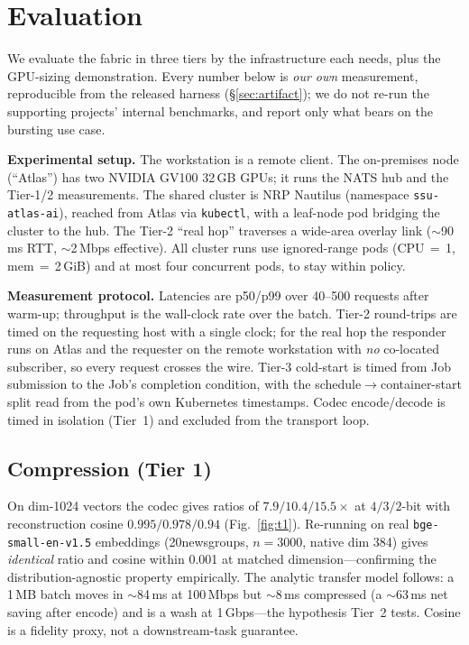 \documentclass[conference]{IEEEtran}
\begin{document}
\section{Evaluation}\label{sec:eval}
We evaluate the fabric in three tiers by the infrastructure each needs, plus the GPU-sizing
demonstration. Every number below is \emph{our own} measurement, reproducible from the released
harness (\S\ref{sec:artifact}); we do not re-run the supporting projects' internal benchmarks, and
report only what bears on the bursting use case.

\textbf{Experimental setup.} The workstation is a remote client. The on-premises node (``Atlas'')
has two NVIDIA GV100 32\,GB GPUs; it runs the NATS hub and the Tier-1/2 measurements. The shared
cluster is NRP Nautilus (namespace \texttt{ssu-atlas-ai}), reached from Atlas via \texttt{kubectl},
with a leaf-node pod bridging the cluster to the hub. The Tier-2 ``real hop'' traverses a
wide-area overlay link ($\sim$90\,ms RTT, $\sim$2\,Mbps effective). All cluster runs use
ignored-range pods (CPU\,$=$\,1, mem\,$=$\,2\,GiB) and at most four concurrent pods, to stay within
policy.

\textbf{Measurement protocol.} Latencies are p50/p99 over 40--500 requests after warm-up;
throughput is the wall-clock rate over the batch. Tier-2 round-trips are timed on the requesting
host with a single clock; for the real hop the responder runs on Atlas and the requester on the
remote workstation with \emph{no} co-located subscriber, so every request crosses the wire. Tier-3
cold-start is timed from Job submission to the Job's completion condition, with the
schedule$\to$container-start split read from the pod's own Kubernetes timestamps. Codec
encode/decode is timed in isolation (Tier~1) and excluded from the transport loop.

\subsection{Compression (Tier 1)}
On dim-1024 vectors the codec gives ratios of $7.9/10.4/15.5\times$ at $4/3/2$-bit with
reconstruction cosine $0.995/0.978/0.94$ (Fig.~\ref{fig:t1}). Re-running on real
\texttt{bge-small-en-v1.5} embeddings (20newsgroups, $n{=}3000$, native dim 384) gives
\emph{identical} ratio and cosine within 0.001 at matched dimension---confirming the
distribution-agnostic property empirically. The analytic transfer model follows: a 1\,MB batch
moves in $\sim$84\,ms at 100\,Mbps but $\sim$8\,ms compressed (a $\sim$63\,ms net saving after
encode) and is a wash at 1\,Gbps---the hypothesis Tier~2 tests. Cosine is a fidelity proxy, not a
downstream-task guarantee.
\end{document}
